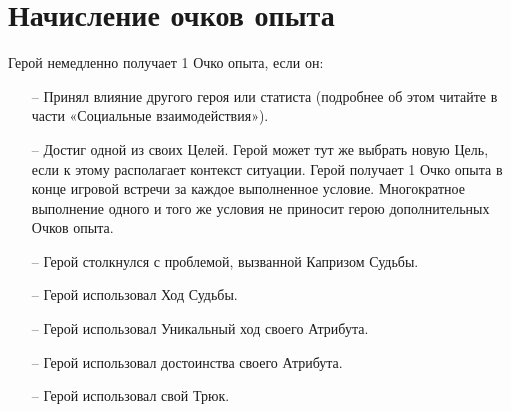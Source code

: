 \section{Начисление очков опыта}
Герой немедленно получает 1 Очко опыта, если он:
\begin{itemize}
\item[--] Принял влияние другого героя или статиста (подробнее об этом читайте в части «Социальные взаимодействия»).
\item[--] Достиг одной из своих Целей. Герой может тут же выбрать новую Цель, если к этому располагает контекст ситуации. Герой получает 1 Очко опыта в конце игровой встречи за каждое выполненное условие. Многократное выполнение одного и того же условия не приносит герою дополнительных Очков опыта.
\item[--] Герой столкнулся с проблемой, вызванной Капризом Судьбы.
\item[--] Герой использовал Ход Судьбы.
\item[--] Герой использовал Уникальный ход своего Атрибута.
\item[--] Герой использовал достоинства своего Атрибута.
\item[--] Герой использовал свой Трюк.
\end{itemize}

